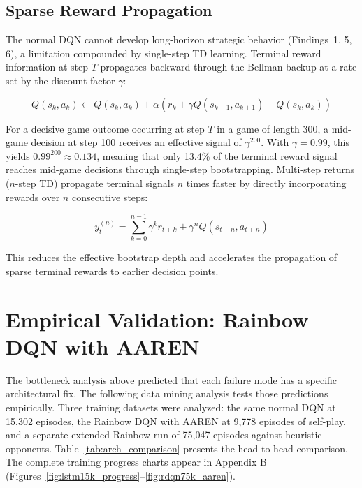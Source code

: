 \subsection{Sparse Reward Propagation}

The normal DQN cannot develop long-horizon strategic behavior (Findings~1, 5, 6), a limitation compounded by single-step TD learning. Terminal reward information at step $T$ propagates backward through the Bellman backup at a rate set by the discount factor $\gamma$:

\begin{equation}
Q(s_k, a_k) \leftarrow Q(s_k, a_k) + \alpha \left( r_k + \gamma Q(s_{k+1}, a_{k+1}) - Q(s_k, a_k) \right)
\end{equation}

For a decisive game outcome occurring at step $T$ in a game of length 300, a mid-game decision at step 100 receives an effective signal of $\gamma^{200}$. With $\gamma = 0.99$, this yields $0.99^{200} \approx 0.134$, meaning that only 13.4\% of the terminal reward signal reaches mid-game decisions through single-step bootstrapping. Multi-step returns ($n$-step TD) \cite{RainbowJMLR2021} propagate terminal signals $n$ times faster by directly incorporating rewards over $n$ consecutive steps:

\begin{equation}
y_t^{(n)} = \sum_{k=0}^{n-1} \gamma^k r_{t+k} + \gamma^n Q(s_{t+n}, a_{t+n})
\end{equation}

This reduces the effective bootstrap depth and accelerates the propagation of sparse terminal rewards to earlier decision points.


\section{Empirical Validation: Rainbow DQN with AAREN}

The bottleneck analysis above predicted that each failure mode has a specific architectural fix. The following data mining analysis tests those predictions empirically. Three training datasets were analyzed: the same normal DQN at 15,302 episodes, the Rainbow DQN with AAREN at 9,778 episodes of self-play, and a separate extended Rainbow run of 75,047 episodes against heuristic opponents. Table~\ref{tab:arch_comparison} presents the head-to-head comparison. The complete training progress charts appear in Appendix B (Figures~\ref{fig:lstm15k_progress}--\ref{fig:rdqn75k_aaren}).

